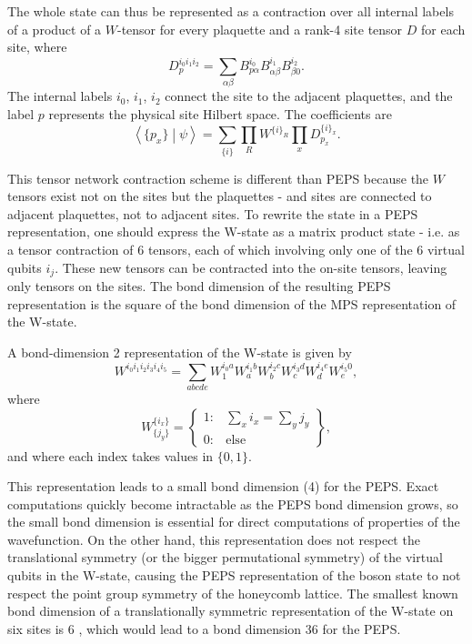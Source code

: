 \documentclass{article}
\newcommand{\braket}[2]{\left \langle #1 \middle |#2 \right \rangle}
\begin{document}
The whole state can thus be represented as a contraction over all internal labels of a product of a $W$-tensor for every plaquette and a rank-4 site tensor $D$ for each site, where
$$
D_{p}^{i_0 i_1 i_2} = \sum\limits_{\alpha \beta} B^{i_0}_{p \alpha}B^{i_1}_{\alpha \beta} B^{i_2}_{\beta 0}.
$$
The internal labels $i_0$, $i_1$, $i_2$ connect the site to the adjacent plaquettes, and the label $p$ represents the physical site Hilbert space. The coefficients are
\begin{equation}
\braket{\{p_x\}}{\psi} = \sum\limits_{\{i\}} \prod\limits_{R} W^{\{i\}_R} \prod\limits_x D_{p_x}^{\{i\}_x}.
\label{eq:PEPS}
\end{equation}

This tensor network contraction scheme is different than PEPS because the $W$ tensors exist not on the sites but the plaquettes - and sites are connected to adjacent plaquettes, not to adjacent sites. To rewrite the state in a PEPS representation, one should express the W-state as a matrix product state - i.e. as a tensor contraction of 6 tensors, each of which involving only one of the 6 virtual qubits $i_j$. These new tensors can be contracted into the on-site tensors, leaving only tensors on the sites. The bond dimension of the resulting PEPS representation is the square of the bond dimension of the MPS representation of the W-state. 

A bond-dimension 2 representation of the W-state is given by
$$
W^{i_0 i_1 i_2 i_3 i_4 i_5} = \sum\limits_{abcde} W^{i_0 a}_{1} W^{i_1 b}_{a} W^{i_2 c}_{b} W^{i_3 d}_{c} W^{i_4 e}_{d} W^{i_5 0}_{e},
$$
where 
$$ W^{\{i_x\}}_{\{j_y\}}  = \left\{ \begin{array}{lr}
													1  : & \sum\limits_x i_x = \sum\limits_y j_y \\
													0  : & \text{else}
													\end{array}
											\right\},
$$
and where each index takes values in $\{0, 1\}$.

This representation leads to a small bond dimension (4) for the PEPS. Exact computations quickly become intractable as the PEPS bond dimension grows, so the small bond dimension is essential for direct computations of properties of the wavefunction. On the other hand, this representation does not respect the translational symmetry (or the bigger permutational symmetry) of the virtual qubits in the W-state, causing the PEPS representation of the boson state to not respect the point group symmetry of the honeycomb lattice. The smallest known bond dimension of a translationally symmetric representation of the W-state on six sites is 6 \cite{Perez2006}, which would lead to a bond dimension 36 for the PEPS. 
 
\end{document}
